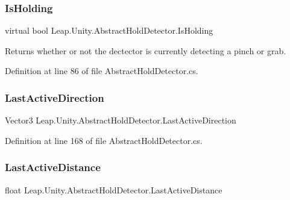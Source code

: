 \subsubsection{\texorpdfstring{IsHolding}{IsHolding}}
{\footnotesize\ttfamily virtual bool Leap.\+Unity.\+Abstract\+Hold\+Detector.\+Is\+Holding\hspace{0.3cm}{\ttfamily [get]}}



Returns whether or not the dectector is currently detecting a pinch or grab. 



Definition at line 86 of file Abstract\+Hold\+Detector.\+cs.

\mbox{\label{class_leap_1_1_unity_1_1_abstract_hold_detector_aa441439133054464eaccf90f863b66cb}} 
\subsubsection{\texorpdfstring{LastActiveDirection}{LastActiveDirection}}
{\footnotesize\ttfamily Vector3 Leap.\+Unity.\+Abstract\+Hold\+Detector.\+Last\+Active\+Direction\hspace{0.3cm}{\ttfamily [get]}}



Definition at line 168 of file Abstract\+Hold\+Detector.\+cs.

\mbox{\label{class_leap_1_1_unity_1_1_abstract_hold_detector_af98af3733f75b2a9f9231dd0eb163952}} 
\subsubsection{\texorpdfstring{LastActiveDistance}{LastActiveDistance}}
{\footnotesize\ttfamily float Leap.\+Unity.\+Abstract\+Hold\+Detector.\+Last\+Active\+Distance\hspace{0.3cm}{\ttfamily [get]}}



